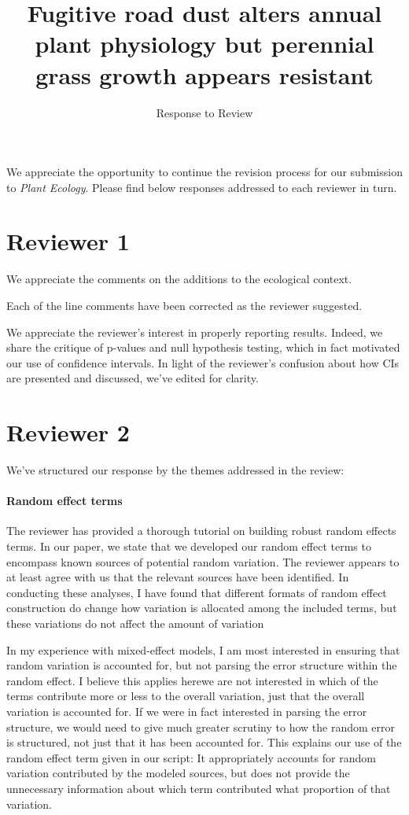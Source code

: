 \documentclass[parskip=half]{scrartcl}
\title{\Large Fugitive road dust alters annual plant physiology but perennial grass growth appears resistant}
\subtitle{Response to Review}
\author{ }
\date{}
\begin{document}
\maketitle

\vspace{-2cm} 

We appreciate the opportunity to continue the revision process for our submission to \emph{Plant Ecology}. 
Please find below responses addressed to each reviewer in turn. 


\section*{Reviewer 1}

We appreciate the comments on the additions to the ecological context. 

Each of the line comments have been corrected as the reviewer suggested. 

We appreciate the reviewer's interest in properly reporting results. 
Indeed, we share the critique of p-values and null hypothesis testing, which in fact motivated our use of confidence intervals. 
In light of the reviewer's confusion about how CIs are presented and discussed, we've edited for clarity.

\section*{Reviewer 2}

We've structured our response by the themes addressed in the review:

\paragraph{Random effect terms} 
The reviewer has provided a thorough tutorial on building robust random effects terms. 
In our paper, we state that we developed our random effect terms to encompass known sources of potential random variation. 
The reviewer appears to at least agree with us that the relevant sources have been identified. 
In conducting these analyses, I have found that different formats of random effect construction do change how variation is allocated among the included terms, but these variations do not affect the amount of variation 

In my experience with mixed-effect models, I am most interested in ensuring that random variation is accounted for, but not parsing the error structure within the random effect. 
I believe this applies here\textemdash we are not interested in which of the terms contribute more or less to the overall variation, just that the overall variation is accounted for. 
If we were in fact interested in parsing the error structure, we would need to give much greater scrutiny to how the random error is structured, not just that it has been accounted for.
This explains our use of the random effect term given in our script: It appropriately accounts for random variation contributed by the modeled sources, but does not provide the unnecessary information about which term contributed what proportion of that variation. 
\end{document}
